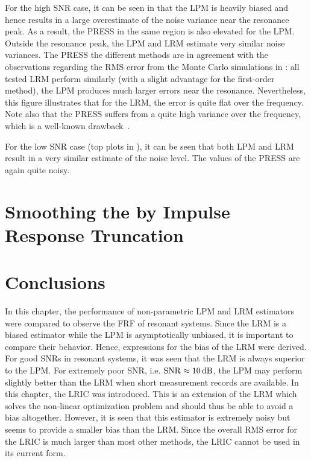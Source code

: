 For the high \gls{SNR} case, it can be seen in  that the \gls{LPM} is heavily biased and hence results in a large overestimate of the noise variance near the resonance peak.
As a result, the \gls{PRESS} in the same region is also elevated for the \gls{LPM}.
Outside the resonance peak, the \gls{LPM} and \gls{LRM} estimate very similar noise variances.
The \gls{PRESS} the different methods are in agreement with the observations regarding the \gls{RMS} error from the Monte Carlo simulations in : all tested \gls{LRM} perform similarly (with a slight advantage for the first-order method), the \gls{LPM} produces much larger errors near the resonance.
Nevertheless, this figure illustrates that for the \gls{LRM}, the error is quite flat over the frequency.
Note also that the \gls{PRESS} suffers from a quite high variance over the frequency, which is a well-known drawback~\citep{Seber2003,Arlot2010}.

For the low \gls{SNR} case (top plots in   ), it can be seen that both \gls{LPM} and \gls{LRM} result in a very similar estimate of the noise level.
The values of the \gls{PRESS} are again quite noisy.


\section{Smoothing the  by Impulse Response Truncation}


\section{Conclusions}
\label{sec:conclusion}
In this chapter, the performance of non-parametric \gls{LPM} and \gls{LRM} estimators were compared to observe the \gls{FRF} of resonant systems.
Since the \gls{LRM} is a biased estimator while the \gls{LPM} is asymptotically unbiased, it is important to compare their behavior.
Hence, expressions for the bias of the \gls{LRM} were derived.
For good \glspl{SNR} in resonant systems, it was seen that the \gls{LRM} is always superior to the \gls{LPM}.
For extremely poor \gls{SNR}, i.e. $\mathrm{SNR} \approx 10\,\mathrm{dB}$, the \gls{LPM} may perform slightly better than the \gls{LRM} when short measurement records are available.
In this chapter, the \gls{LRIC} was introduced.
This is an extension of the \gls{LRM} which solves the non-linear optimization problem and should thus be able to avoid a bias altogether.
However, it is seen that this estimator is extremely noisy but seems to provide a smaller bias than the \gls{LRM}.
Since the overall \gls{RMS} error for the \gls{LRIC} is much larger than most other methods, the \gls{LRIC} cannot be used in its current form.

